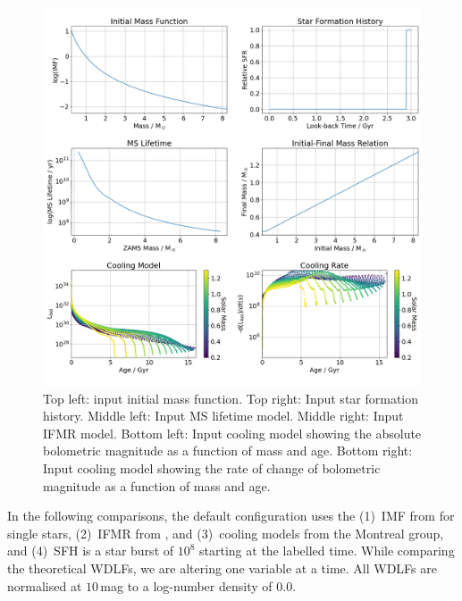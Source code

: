 \documentclass[fleqn,usenatbib]{rasti}
\begin{document}
\begin{figure}
    \centering
    \includegraphics[width=\textwidth]{input_model.png}
    \caption{Top left: input initial mass function. Top right: Input star
    formation history. Middle left: Input MS lifetime model. Middle right:
    Input IFMR model. Bottom left: Input cooling model showing the absolute
    bolometric magnitude as a function of mass and age. Bottom right: Input
    cooling model showing the rate of change of bolometric magnitude as a
    function of mass and age.}
    \label{fig:input_model}
\end{figure}

In the following comparisons, the default configuration uses the (1)~IMF
from \citet{2003PASP..115..763C} for single stars, (2)~IFMR from
\citet{2008MNRAS.387.1693C}, and (3)~cooling models from the Montreal group,
and (4)~SFH is a star burst of $10^8$ starting at the labelled time.
While comparing the theoretical WDLFs, we are altering one variable at a time.
All WDLFs are normalised at $10$\,mag to a log-number density of $0.0$.
\end{document}
